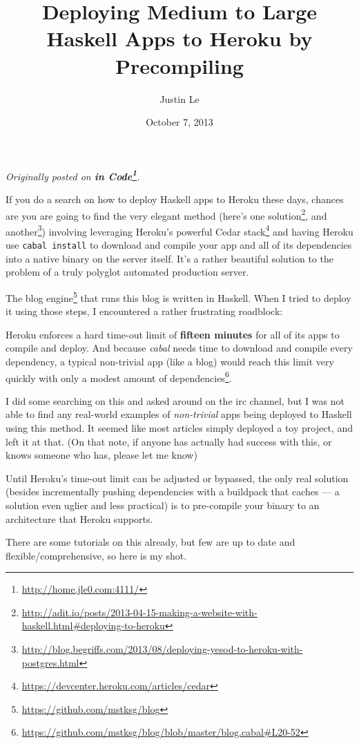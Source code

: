\documentclass[]{article}
\title{Deploying Medium to Large Haskell Apps to Heroku by Precompiling}
\author{Justin Le}
\date{October 7, 2013}
\renewcommand{\href}[2]{#2\footnote{\url{#1}}}
\begin{document}
\maketitle

\emph{Originally posted on \textbf{\href{http://home.jle0.com:4111/}{in
Code}}.}

If you do a search on how to deploy Haskell apps to Heroku these days,
chances are you are going to find the very elegant method (here's
\href{http://adit.io/posts/2013-04-15-making-a-website-with-haskell.html\#deploying-to-heroku}{one
solution}, and
\href{http://blog.begriffs.com/2013/08/deploying-yesod-to-heroku-with-postgres.html}{another})
involving leveraging Heroku's powerful
\href{https://devcenter.heroku.com/articles/cedar}{Cedar stack} and
having Heroku use \texttt{cabal\ install} to download and compile your
app and all of its dependencies into a native binary on the server
itself. It's a rather beautiful solution to the problem of a truly
polyglot automated production server.

The \href{https://github.com/mstksg/blog}{blog engine} that runs this
blog is written in Haskell. When I tried to deploy it using those steps,
I encountered a rather frustrating roadblock:

Heroku enforces a hard time-out limit of \textbf{fifteen minutes} for
all of its apps to compile and deploy. And because \emph{cabal} needs
time to download and compile every dependency, a typical non-trivial app
(like a blog) would reach this limit very quickly with only a
\href{https://github.com/mstksg/blog/blob/master/blog.cabal\#L20-52}{modest
amount of dependencies}.

I did some searching on this and asked around on the irc channel, but I
was not able to find any real-world examples of \emph{non-trivial} apps
being deployed to Haskell using this method. It seemed like most
articles simply deployed a toy project, and left it at that. (On that
note, if anyone has actually had success with this, or knows someone who
has, please let me know)

Until Heroku's time-out limit can be adjusted or bypassed, the only real
solution (besides incrementally pushing dependencies with a buildpack
that caches --- a solution even uglier and less practical) is to
pre-compile your binary to an architecture that Heroku supports.

There are some tutorials on this already, but few are up to date and
flexible/comprehensive, so here is my shot.
\end{document}
